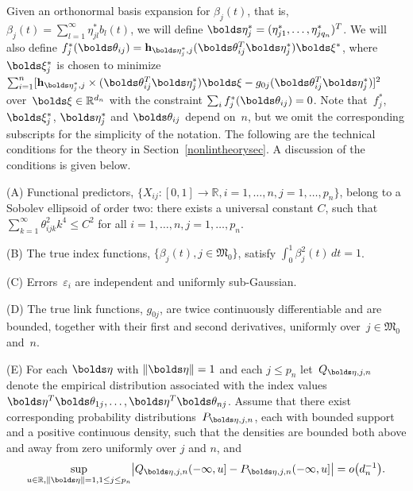 \documentclass[aos,MSNbibl,dvips]{arximspdf}
\newcommand{\rrvert}{\vert}
\newcommand{\rrVert}{\Vert}
\newcommand{\llvert}{\vert}
\newcommand{\llVert}{\Vert}
\newcommand{\btheta}{\bolds\theta}
\newcommand{\bfeta}{\bolds\eta}
\newcommand{\bxi}{\bolds\xi}
\newcommand{\bh}{{\mathbf h}}
\def\RR{\mathbb{R}}
\newcommand{\Mfrak}{\mathfrak{M}}
\begin{document}
\begin{appendix}
Given an orthonormal basis expansion for $\beta_j(t)$, that is, $\beta
_j(t)=\sum_{l=1}^{\infty}\eta^*_{jl}b_l(t)$, we will define $\bfeta
_j^*=(\eta^*_{j1},\ldots,\eta^*_{jq_n})^T$.
We will also define $f_j^*(\btheta_{ij})=\bh_{\bfeta^*_j,j}(\btheta
_{ij}^T\bfeta_j^*)\bxi^*$, where $\bxi_j^*$ is chosen to minimize
$\sum_{i=1}^n [\bh_{\bfeta^*_j,j}\times\break (\btheta_{ij}^T\bfeta_j^*)\bxi
-g_{0j}(\btheta_{ij}^T\bfeta_j^*)]^2$ over~$\bxi\in\RR^{d_n}$ with
the constraint $\sum_i f_j^*(\btheta_{ij})=0$. Note that~$f_j^*$,
$\bxi_j^*$, $\bfeta_j^*$ and $\btheta_{ij}$ depend\vspace*{1pt} on~$n$, but we
omit the corresponding subscripts for the simplicity of the notation.
The following are the technical conditions for the theory in
Section~\ref{nonlintheorysec}. A discussion of the conditions is
given below.

\begin{assumption}\label{cond3}
(A) Functional predictors, $\{X_{ij}:[0,1]\rightarrow\RR,
i=1,\ldots,n, j=1,\ldots,{p_n}\}$, belong\vspace*{1pt} to a Sobolev ellipsoid of
order two: there exists a universal constant $C$, such that $\sum
_{k=1}^{\infty} \theta^2_{ijk}k^4\le C^2$ for all $i=1,\ldots,n,
j=1,\ldots,{p_n}$.

(B) The true index functions, $\{\beta_j(t), j\in\Mfrak_0\}
$, satisfy $\int_0^1\beta^2_j(t)\,dt=1$.

(C) Errors~$\varepsilon_i$ are independent and uniformly
sub-Gaussian.

(D) The true link functions, $g_{0j}$, are twice continuously
differentiable and are bounded, together with their first and second
derivatives, uniformly over~$j\in\Mfrak_0$ and~$n$.

(E) For\vspace*{1pt} each $\bfeta$ with $\llVert \bfeta\rrVert =1$ and each
$j\le
{p_n}$ let~$Q_{\bfeta,j,n}$ denote the empirical distribution
associated with the index values $\bfeta^T\btheta_{1j},\ldots,
\bfeta^T\btheta_{nj}$. Assume that there exist corresponding
probability distributions~$P_{\bfeta,j,n}$, each with bounded support
and a positive continuous density, such that the densities are bounded
both above and away from zero uniformly over $j$ and $n$, and
%
\begin{equation}
\sup_{u\in\RR, \llVert \bfeta\rrVert =1, 1\le j\le{p_n}}\bigl\llvert
Q_{\bfeta
,j,n}(-
\infty,u]-P_{\bfeta,j,n}(-\infty,u]\bigr\rrvert=o \bigl(d_n^{-1}
\bigr).
\end{equation}
%
\end{assumption}


\end{appendix}
\end{document}

